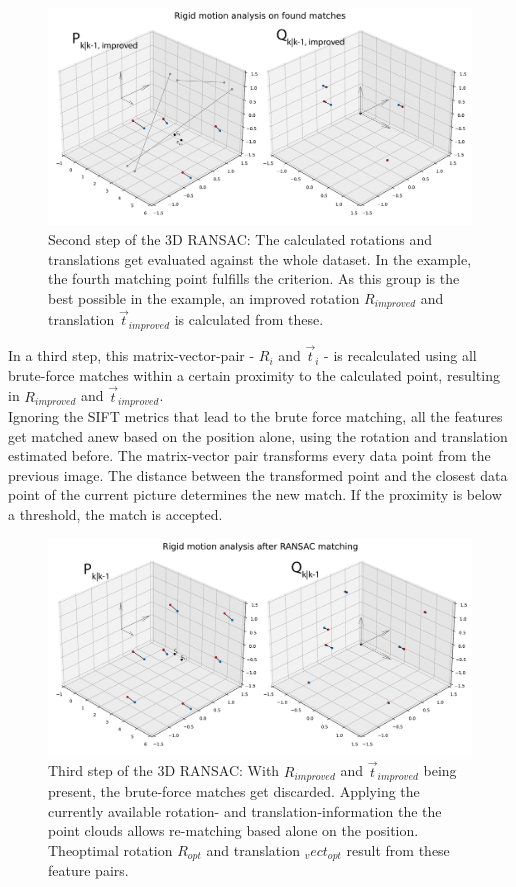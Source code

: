 \begin{figure}[H]
    \centering
    \includegraphics[width=1.0\textwidth]{images/ransac_3d_step2.pdf}
    \caption{Second step of the 3D RANSAC: The calculated rotations and translations get evaluated against the whole dataset. In the example, the fourth matching point fulfills the criterion. As this group is the best possible in the example, an improved rotation $R_{improved}$ and translation $\vec{t}_{improved}$ is calculated from these.}
    \label{im:ransac2}
\end{figure}
 In a third step, this matrix-vector-pair - $R_{i}$ and $\vec{t}_{i}$ - is recalculated using all brute-force matches within a certain proximity to the calculated point, resulting in $R_{improved}$ and $\vec{t}_{improved}$.\\
Ignoring the SIFT metrics that lead to the brute force matching, all the features get matched anew based on the position alone, using the rotation and translation estimated before. The matrix-vector pair transforms every data point from the previous image. The distance between the transformed point and the closest data point of the current picture determines the new match. If the proximity is below a threshold, the match is accepted.
\begin{figure}[H]
    \centering
    \includegraphics[width=1.0\textwidth]{images/ransac_3d_step3.pdf}
    \caption{Third step of the 3D RANSAC: With $R_{improved}$ and $\vec{t}_{improved}$ being present, the brute-force matches get discarded. Applying the currently available rotation- and translation-information the the point clouds allows re-matching based alone on the position. Theoptimal rotation $R_{opt}$ and translation $_vec{t}_{opt}$ result from these feature pairs.}
    \label{im:ransac3}
\end{figure}
